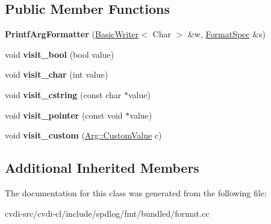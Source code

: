 \subsection*{Public Member Functions}
\begin{DoxyCompactItemize}
\item 
{\bfseries Printf\+Arg\+Formatter} (\hyperlink{classfmt_1_1BasicWriter}{Basic\+Writer}$<$ Char $>$ \&w, \hyperlink{structfmt_1_1FormatSpec}{Format\+Spec} \&s)\hypertarget{classfmt_1_1internal_1_1PrintfArgFormatter_add5c9219de52b2e2f5d65d2736c7c9bf}{}\label{classfmt_1_1internal_1_1PrintfArgFormatter_add5c9219de52b2e2f5d65d2736c7c9bf}

\item 
void {\bfseries visit\+\_\+bool} (bool value)\hypertarget{classfmt_1_1internal_1_1PrintfArgFormatter_a9bbc1d48d1e781f9a15c5a94161bc8cb}{}\label{classfmt_1_1internal_1_1PrintfArgFormatter_a9bbc1d48d1e781f9a15c5a94161bc8cb}

\item 
void {\bfseries visit\+\_\+char} (int value)\hypertarget{classfmt_1_1internal_1_1PrintfArgFormatter_a17e33efa05145a8bd040ded42a1be92b}{}\label{classfmt_1_1internal_1_1PrintfArgFormatter_a17e33efa05145a8bd040ded42a1be92b}

\item 
void {\bfseries visit\+\_\+cstring} (const char $\ast$value)\hypertarget{classfmt_1_1internal_1_1PrintfArgFormatter_aecc9a8257acaa9e47fac68e7a4c02592}{}\label{classfmt_1_1internal_1_1PrintfArgFormatter_aecc9a8257acaa9e47fac68e7a4c02592}

\item 
void {\bfseries visit\+\_\+pointer} (const void $\ast$value)\hypertarget{classfmt_1_1internal_1_1PrintfArgFormatter_ad2915cafb93887054479120089d31421}{}\label{classfmt_1_1internal_1_1PrintfArgFormatter_ad2915cafb93887054479120089d31421}

\item 
void {\bfseries visit\+\_\+custom} (\hyperlink{structfmt_1_1internal_1_1Value_1_1CustomValue}{Arg\+::\+Custom\+Value} c)\hypertarget{classfmt_1_1internal_1_1PrintfArgFormatter_ab3f93bc2476db68b7f3e2a5530a57916}{}\label{classfmt_1_1internal_1_1PrintfArgFormatter_ab3f93bc2476db68b7f3e2a5530a57916}

\end{DoxyCompactItemize}
\subsection*{Additional Inherited Members}


The documentation for this class was generated from the following file\+:\begin{DoxyCompactItemize}
\item 
cvdi-\/src/cvdi-\/cl/include/spdlog/fmt/bundled/format.\+cc\end{DoxyCompactItemize}

